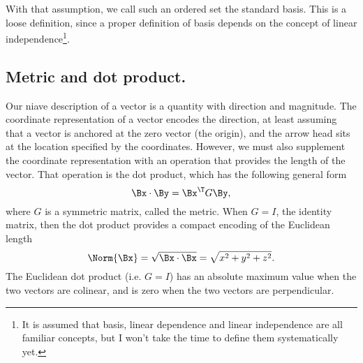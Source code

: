 With that assumption, we call such an ordered set the standard basis.
This is a loose definition, since a proper definition of basis depends on the concept of linear independence\footnote{It is assumed that basis, linear dependence and linear independence are all familiar concepts, but I won't take the time to define them systematically yet.}.
%
%
%

\subsection{Metric and dot product.}
Our niave description of a vector is a quantity with direction and magnitude.
The
coordinate representation of a vector encodes the direction, at least assuming that a vector is anchored at the zero vector (the origin), and the arrow head sits at the location specified by the coordinates.
However, we must also supplement the coordinate representation with an operation that provides the length of the vector.
That operation is the dot product, which has the following general form
\begin{dmath}\label{eqn:multivector:101}
\Bx \cdot \By = \Bx^\T G \By,
\end{dmath}
where \( G \) is a symmetric matrix, called the metric.
When \( G = I \), the identity matrix, then the dot product provides a compact encoding of the Euclidean length
\begin{equation}\label{eqn:multivector:80}
\Norm{\Bx} = \sqrt{ \Bx \cdot \Bx } = \sqrt{x^2 + y^2 + z^2}.
\end{equation}
The Euclidean dot product (i.e. \( G = I \)) has an absolute maximum value when the two vectors are colinear, and is zero when the two vectors are perpendicular.

